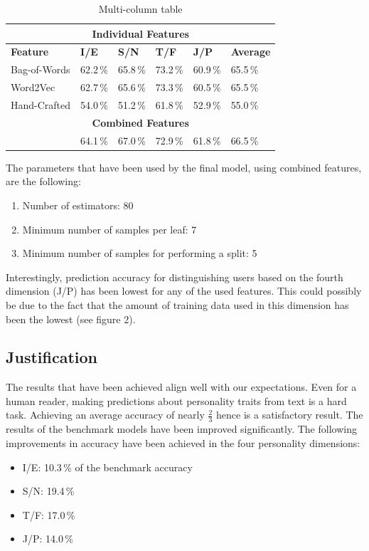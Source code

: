 \documentclass[12pt]{elsarticle}
\begin{document}
\begin{table}[ht]
\caption{Multi-column table}
\begin{center}
\begin{tabular}{l | l | l | l | l | l }
    \hline
    \multicolumn{6}{c}{\textbf{Individual Features}}\\
    \hline
    \textbf{Feature}  & \textbf{I/E} & \textbf{S/N}&\textbf{T/F}&\textbf{J/P}& \textbf{Average}\\
    {Bag-of-Words} & 62.2\,\%& 65.8\,\%& 73.2\,\%& 60.9\,\%& 65.5\,\% \\
	{Word2Vec}& 62.7\,\%& 65.6\,\%& 73.3\,\%& 60.5\,\%    & 65.5\,\%\\
    {Hand-Crafted}& 54.0\,\%& 51.2\,\%& 61.8\,\%& 52.9\,\%  & 55.0\,\% \\
    \hline
    \multicolumn{6}{c}{\textbf{Combined Features}}\\
    \hline
                  & 64.1\,\%& 67.0\,\%& 72.9\,\%& 61.8\,\%& 66.5\,\% \\
    \hline
\end{tabular}
\end{center}
\label{tab:res}
\end{table}

The parameters that have been used by the final model, using combined features, are the following:
\begin{enumerate}
\item Number of estimators: 80
\item Minimum number of samples per leaf: 7
\item Minimum number of samples for performing a split: 5
\end{enumerate}


Interestingly, prediction accuracy for distinguishing users based on the fourth dimension (J/P) has been lowest for any of the used features. This could possibly be due to the fact that the amount of training data used in this dimension has been the lowest (see figure 2).





\subsection{Justification}
The results that have been achieved align well with our expectations. Even for a human reader, making predictions about personality traits from text is a hard task. Achieving an average accuracy of nearly $\frac{2}{3}$ hence is a satisfactory result. The results of the benchmark models have been improved significantly. The following improvements in accuracy have been achieved in the four personality dimensions:
\begin{itemize}
\item I/E: 10.3\,\% of the benchmark accuracy
\item S/N: 19.4\,\%
\item T/F: 17.0\,\%
\item J/P: 14.0\,\%
\end{itemize}
\end{document}
